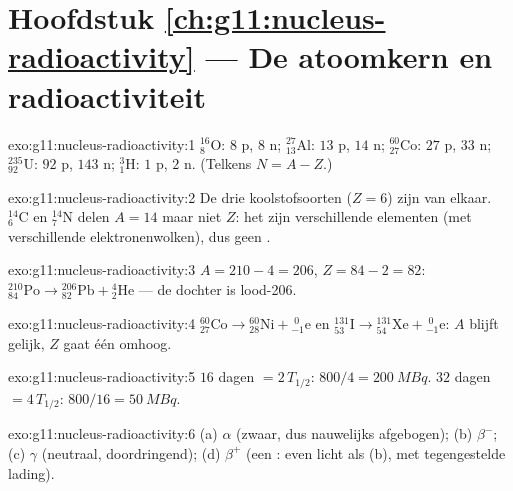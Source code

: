 \section*{Hoofdstuk \ref{ch:g11:nucleus-radioactivity} --- De atoomkern en radioactiviteit}

\begin{solution}{exo:g11:nucleus-radioactivity:1}
${}^{16}_{8}\mathrm{O}$: $8$ p, $8$ n; ${}^{27}_{13}\mathrm{Al}$: $13$ p,
$14$ n; ${}^{60}_{27}\mathrm{Co}$: $27$ p, $33$ n;
${}^{235}_{92}\mathrm{U}$: $92$ p, $143$ n; ${}^{3}_{1}\mathrm{H}$: $1$ p,
$2$ n. (Telkens $N = A - Z$.)
\end{solution}

\begin{solution}{exo:g11:nucleus-radioactivity:2}
De drie koolstofsoorten ($Z = 6$) zijn  van elkaar.
${}^{14}_{6}\mathrm{C}$ en ${}^{14}_{7}\mathrm{N}$ delen $A = 14$ maar
niet $Z$: het zijn verschillende elementen (met verschillende
elektronenwolken), dus geen .
\end{solution}

\begin{solution}{exo:g11:nucleus-radioactivity:3}
$A = 210 - 4 = 206$, $Z = 84 - 2 = 82$:
${}^{210}_{84}\mathrm{Po} \to {}^{206}_{82}\mathrm{Pb} +
{}^{4}_{2}\mathrm{He}$ --- de dochter is lood-206.
\end{solution}

\begin{solution}{exo:g11:nucleus-radioactivity:4}
${}^{60}_{27}\mathrm{Co} \to {}^{60}_{28}\mathrm{Ni} +
{}^{\;0}_{-1}\mathrm{e}$ en
${}^{131}_{53}\mathrm{I} \to {}^{131}_{54}\mathrm{Xe} +
{}^{\;0}_{-1}\mathrm{e}$: $A$ blijft gelijk, $Z$ gaat één omhoog.
\end{solution}

\begin{solution}{exo:g11:nucleus-radioactivity:5}
$16$ dagen $= 2\,T_{1/2}$: $800/4 = \qty{200}{MBq}$. $32$ dagen
$= 4\,T_{1/2}$: $800/16 = \qty{50}{MBq}$.
\end{solution}

\begin{solution}{exo:g11:nucleus-radioactivity:6}
(a) $\alpha$ (zwaar, dus nauwelijks afgebogen); (b) $\beta^-$;
(c) $\gamma$ (neutraal, doordringend); (d) $\beta^+$ (een : even
licht als (b), met tegengestelde lading).
\end{solution}


